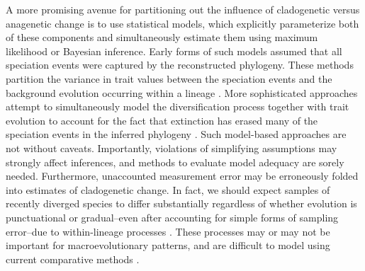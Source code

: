 A more promising avenue for partitioning out the influence of cladogenetic versus anagenetic change is to use statistical models, which explicitly parameterize both of these components and simultaneously estimate them using maximum likelihood or Bayesian inference. Early forms of such models assumed that all speciation events were captured by the reconstructed phylogeny. These methods partition the variance in trait values between the speciation events and the background evolution occurring within a lineage \citep{Pagel1997, Mooers1999, Bokma2002, Wagner2000, WagnerMarcot2010}. More sophisticated approaches attempt to simultaneously model the diversification process together with trait evolution \citep[][see \textsc{box 3} for details]{Bokma2002, Mattila2008, Bokma2008, Bokma2010, Goldberg2012, MagnusonFord2012, Simpson2013} to account for the fact that extinction has erased many of the speciation events in the inferred phylogeny \citep{Nee1992, Nee1994, Nee2006, Ricklefs2007}. Such model-based approaches are not without caveats. Importantly, violations of simplifying assumptions may strongly affect inferences, and methods to evaluate model adequacy are sorely needed. Furthermore, unaccounted measurement error may be erroneously folded into estimates of cladogenetic change. In fact, we should expect samples of recently diverged species to differ substantially regardless of whether evolution is punctuational or gradual--even after accounting for simple forms of sampling error--due to within-lineage processes \citep[e.g., as the result of geographic range variation;][]{Uyeda2011, Houle2011, Hansen2012book}. These processes may or may not be important for macroevolutionary patterns, and are difficult to model using current comparative methods \citep{Futuyma1987,Futuyma2010,Stone2011}.
	
